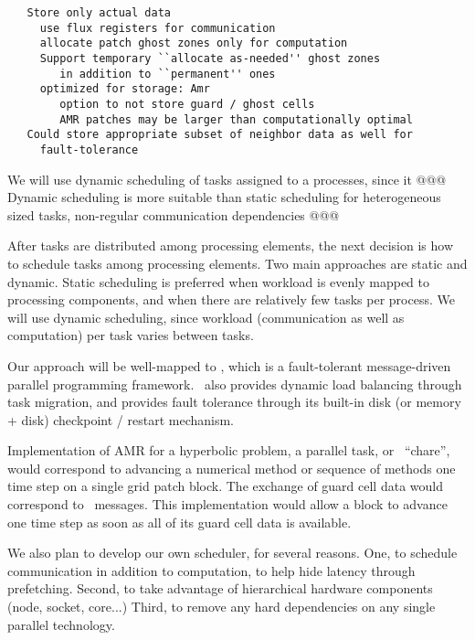 \documentclass[10pt]{article}
\begin{document}
\begin{verbatim}
   Store only actual data
     use flux registers for communication
     allocate patch ghost zones only for computation
     Support temporary ``allocate as-needed'' ghost zones
        in addition to ``permanent'' ones
     optimized for storage: Amr
        option to not store guard / ghost cells
        AMR patches may be larger than computationally optimal
   Could store appropriate subset of neighbor data as well for
     fault-tolerance
\end{verbatim}

We will use dynamic scheduling of tasks assigned to a processes, since
it @@@  Dynamic scheduling is more suitable than static scheduling for
heterogeneous sized tasks, non-regular communication dependencies @@@


After tasks are distributed among processing elements, the next
decision is how to schedule tasks among processing elements.  Two main
approaches are static and dynamic.  Static scheduling is preferred
when workload is evenly mapped to processing components, and when
there are relatively few tasks per process.  We will use dynamic
scheduling, since workload (communication as well as computation) per
task varies between tasks.

 Our approach will be well-mapped to \charm,
which is a fault-tolerant message-driven parallel programming
framework.  \charm\ also provides dynamic load balancing through task
migration, and provides fault tolerance through its built-in disk (or
memory + disk) checkpoint / restart mechanism.

Implementation of AMR for a hyperbolic problem, a parallel task, or
\charm\  ``chare'', would correspond to advancing a numerical method or
sequence of methods one time step on a single grid patch block.  The
exchange of guard cell data would correspond to \charm\  messages.
This implementation would allow a block to advance one time step as
soon as all of its guard cell data is available.


We also plan to develop our own scheduler, for several reasons.  One,
to schedule communication in addition to computation, to help hide
latency through prefetching.  Second, to take advantage of
hierarchical hardware components (node, socket, core...)  Third, to
remove any hard dependencies on any single parallel technology.
\end{document}
